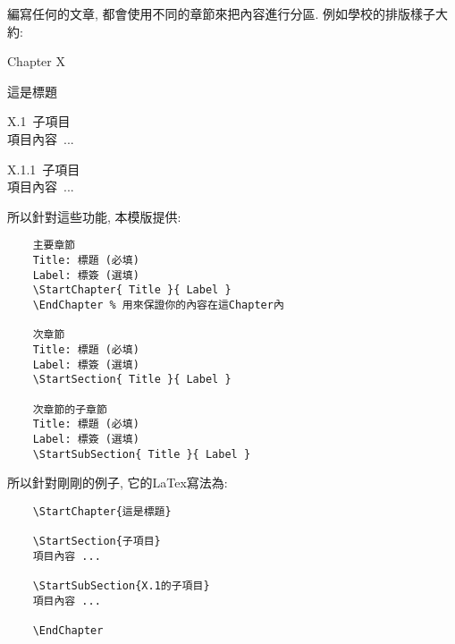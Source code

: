 

編寫任何的文章, 都會使用不同的章節來把內容進行分區. 例如學校的排版樣子大約:

  \EmptyLine
\begin{DescriptionFrame}
  \centerline{\LARGE Chapter X}
  \vspace{0.2cm}
  \centerline{\LARGE 這是標題}

  \vspace{0.5cm}
  \mbox{\Large X.1 子項目}\\
  \mbox{\hspace{1.2cm}項目內容 ...}

  \vspace{0.3cm}
  \mbox{\large X.1.1 子項目}\\
  \mbox{\hspace{1.2cm}項目內容 ...}
\end{DescriptionFrame}
  \EmptyLine

所以針對這些功能, 本模版提供:

  \EmptyLine
\begin{DescriptionFrame}
  \begin{verbatim}
    主要章節
    Title: 標題 (必填)
    Label: 標簽 (選填)
    \StartChapter{ Title }{ Label }
    \EndChapter % 用來保證你的內容在這Chapter內

    次章節
    Title: 標題 (必填)
    Label: 標簽 (選填)
    \StartSection{ Title }{ Label }

    次章節的子章節
    Title: 標題 (必填)
    Label: 標簽 (選填)
    \StartSubSection{ Title }{ Label }
  \end{verbatim}
\end{DescriptionFrame}
  \EmptyLine

所以針對剛剛的例子, 它的LaTex寫法為:

  \EmptyLine
\begin{DescriptionFrame}
  \begin{verbatim}
    \StartChapter{這是標題}

    \StartSection{子項目}
    項目內容 ...

    \StartSubSection{X.1的子項目}
    項目內容 ...

    \EndChapter
  \end{verbatim}
\end{DescriptionFrame}

